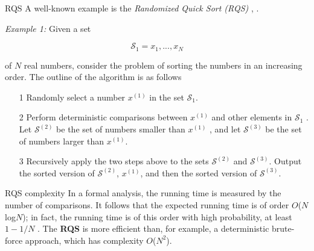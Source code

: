 \documentclass[xcolor={dvipsnames}]{beamer}
\begin{document}
	\begin{frame}{RQS}
        A well-known example is the \textit{Randomized Quick Sort (RQS)} \cite{bib14}, \cite{bib17}.
        \begin{examples}
            \textit{Example 1:} Given a set 
			
			\begin{equation*}
				\mathscr{S}_1 = {x_1 , . . . , x_N } 
			\end{equation*}
			
			of $N$ real numbers, consider the problem of sorting the numbers in an increasing order.
            The outline of the algorithm is as follows
			\begin{itemize}
				\item[1]
				Randomly select a number $x^{(1)}$ in the set $\mathscr{S}_1$.
				\item[2]
				Perform deterministic comparisons between $x^{(1)}$ and other elements in $\mathscr{S}_1$ .
                Let $\mathscr{S}^{(2)}$ be the set of numbers smaller than $x^{(1)}$ , 
                and let $\mathscr{S}^{(3)}$ be the set of numbers larger than $x^{(1)}$.
				\item[3]
				Recursively apply the two steps above to the sets $\mathscr{S}^{(2)}$ and $\mathscr{S}^{(3)}$. 
                Output the sorted version of $\mathscr{S}^{(2)}$, $x^{(1)}$, and then the sorted version 
                of $\mathscr{S}^{(3)}$.
			\end{itemize}
        \end{examples}
			
    \end{frame}

	\begin{frame}{RQS complexity}
        In a formal analysis, the running time is measured by the number of comparisons. 
        It follows that the expected running time is of order $O$($N$log$N$); 
        in fact, the running time is of this order with high probability, at least $1 − 1/N$ \cite{bib15}. 
        The \textbf{RQS} is more efficient than, for example, a deterministic brute-force approach, 
        which has complexity $O$($N^2$).
        
    \end{frame}
\end{document}
